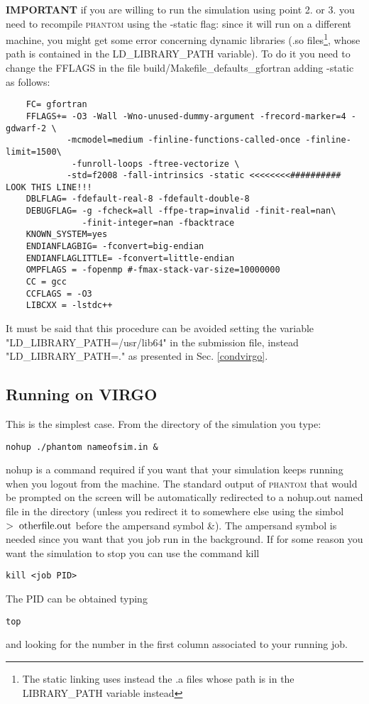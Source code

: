 \documentclass[10pt,a4paper,twoside]{article} %
\begin{document}
\textbf{IMPORTANT} if you are willing to run the simulation using point 2. or 3. you need to recompile \textsc{phantom} using the -static flag: since it will run on a different machine, you might get some error concerning dynamic libraries (.so files\footnote{The static linking uses instead the .a files whose path is in the LIBRARY\_PATH variable instead}, whose path is contained in the LD\_LIBRARY\_PATH variable). To do it you need to change the FFLAGS in the file build/Makefile\_defaults\_gfortran adding -static as follows:

\begin{verbatim}
    FC= gfortran
    FFLAGS+= -O3 -Wall -Wno-unused-dummy-argument -frecord-marker=4 -gdwarf-2 \
            -mcmodel=medium -finline-functions-called-once -finline-limit=1500\
             -funroll-loops -ftree-vectorize \
            -std=f2008 -fall-intrinsics -static <<<<<<<<########## LOOK THIS LINE!!!
    DBLFLAG= -fdefault-real-8 -fdefault-double-8
    DEBUGFLAG= -g -fcheck=all -ffpe-trap=invalid -finit-real=nan\
               -finit-integer=nan -fbacktrace
    KNOWN_SYSTEM=yes
    ENDIANFLAGBIG= -fconvert=big-endian
    ENDIANFLAGLITTLE= -fconvert=little-endian
    OMPFLAGS = -fopenmp #-fmax-stack-var-size=10000000
    CC = gcc
    CCFLAGS = -O3
    LIBCXX = -lstdc++
\end{verbatim}

It must be said that this procedure can be avoided setting the variable "LD\_LIBRARY\_PATH=/usr/lib64" in the submission file, instead "LD\_LIBRARY\_PATH=." as presented in Sec. \ref{condvirgo}.

\subsection{Running on VIRGO}

This is the simplest case. From the directory of the simulation you type:
\begin{verbatim}
nohup ./phantom nameofsim.in &
\end{verbatim}
nohup is a command required if you want that your simulation keeps running when you logout from the machine. The standard output of \textsc{phantom} that would be prompted on the screen will be automatically redirected to a nohup.out named file in the directory (unless you redirect it to somewhere else using the simbol $>\; {\rm otherfile.out}$ before the ampersand symbol \&). The ampersand symbol is needed since you want that you job run in the background.
If for some reason you want the simulation to stop you can use the command kill
\begin{verbatim}
kill <job PID>
\end{verbatim}
The PID can be obtained typing
\begin{verbatim}
top
\end{verbatim}
and looking for the number in the first column associated to your running job.
\end{document}
